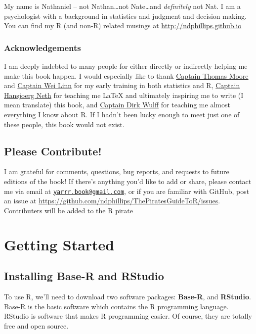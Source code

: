 \documentclass[]{book}
\theoremstyle{definition}
\theoremstyle{definition}
\theoremstyle{remark}
\begin{document}
My name is Nathaniel -- not Nathan\ldots{}not Nate\ldots{}and
\emph{definitely} not Nat. I am a psychologist with a background in
statistics and judgment and decision making. You can find my R (and
non-R) related musings at \url{http://ndphillips.github.io}

\subsection{Acknowledgements}\label{acknowledgements}

I am deeply indebted to many people for either directly or indirectly
helping me make this book happen. I would especially like to thank
\href{https://www.grinnell.edu/users/mooret}{Captain Thomas Moore} and
\href{http://www.math.ohiou.edu/people/directory/linwei}{Captain Wei
Linn} for my early training in both statistics and R,
\href{https://www.spds.uni-konstanz.de/hans-neth}{Captain Hansjoerg
Neth} for teaching me LaTeX and ultimately inspiring me to write (I mean
translate) this book, and
\href{https://psycho.unibas.ch/fakultaet/personen/profil/person/wulff/}{Captain
Dirk Wulff} for teaching me almost everything I know about R. If I
hadn't been lucky enough to meet just one of these people, this book
would not exist.

\section{Please Contribute!}\label{please-contribute}

I am grateful for comments, questions, bug reports, and requests to
future editions of the book! If there's anything you'd like to add or
share, please contact me via email at
\href{mailto:yarrr.book@gmail.com}{\nolinkurl{yarrr.book@gmail.com}}, or
if you are familiar with GitHub, post an issue at
\url{https://github.com/ndphillips/ThePiratesGuideToR/issues}.
Contributers will be added to the R pirate

\chapter{Getting Started}\label{started}

\section{Installing Base-R and
RStudio}\label{installing-base-r-and-rstudio}

To use R, we'll need to download two software packages: \textbf{Base-R},
and \textbf{RStudio}. Base-R is the basic software which contains the R
programming language. RStudio is software that makes R programming
easier. Of course, they are totally free and open source.
\end{document}
